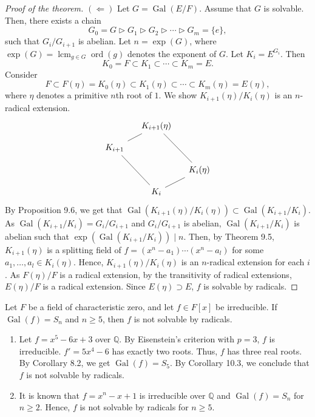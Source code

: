 \documentclass[twoside]{article}
\DeclareMathOperator\Gal{Gal}
\DeclareMathOperator*\lcm{lcm}
\DeclareMathOperator\ord{ord}
\newcommand\Q{\mathbb Q}
\theoremstyle{remark}
\newcounter{theorem}
\begin{document}
\begin{proof}[Proof of the theorem]
  \((\Leftarrow)\) Let \(G = \Gal(E/F)\). Assume that \(G\) is solvable. Then, there exists a chain
  \[ G_0 = G \vartriangleright G_1 \vartriangleright G_2 \vartriangleright \cdots \vartriangleright G_m = \{e\}, \]
  such that \(G_i/G_{i+1}\) is abelian. Let \(n = \exp(G)\), where \(\exp(G) = \lcm_{g \in G} \ord(g)\) denotes the exponent of \(G\). Let \(K_i = E^{G_i}\). Then
  \[ K_0 = F \subset K_1 \subset \cdots \subset K_m = E. \]
  Consider
  \[ F \subset F(\eta) = K_0(\eta) \subset K_1(\eta) \subset \cdots \subset K_m(\eta) = E(\eta), \]
  where \(\eta\) denotes a primitive \(n\)th root of \(1\). We show \(K_{i+1}(\eta)/K_i(\eta)\) is an \(n\)-radical extension.
  \begin{displaymath}
    \begin{tikzcd}[sep=small]
      & K_{i+1}(\eta)\dlar[dash]\ar[ddr,dash] \\
      K_{i+1}\ar[ddr,dash] \\
      && K_i(\eta)\dlar[dash] \\
      & K_i
    \end{tikzcd}
  \end{displaymath}
  By Proposition 9.6, we get that \(\Gal(K_{i+1}(\eta)/K_i(\eta)) \subset \Gal(K_{i+1}/K_i)\). As \(\Gal(K_{i+1}/K_i) = G_i/G_{i+1}\) and \(G_i/G_{i+1}\) is abelian, \(\Gal(K_{i+1}/K_i)\) is abelian such that \(\exp(\Gal(K_{i+1}/K_i)) \mid n\). Then, by Theorem 9.5, \(K_{i+1}(\eta)\) is a splitting field of \(f = (x^n-a_1) \cdots (x^n-a_l)\) for some \(a_1, \dots, a_l \in K_i(\eta)\). Hence, \(K_{i+1}(\eta)/K_i(\eta)\) is an \(n\)-radical extension for each \(i\). As \(F(\eta)/F\) is a radical extension, by the transitivity of radical extensions, \(E(\eta)/F\) is  a radical extension. Since \(E(\eta) \supset E\), \(f\) is solvable by radicals.
\end{proof}

\begin{corollary}
  Let \(F\) be a field of characteristic zero, and let \(f \in F[x]\) be irreducible. If \(\Gal(f) = S_n\) and \(n \geq 5\), then \(f\) is not solvable by radicals.
\end{corollary}

\begin{examples}
  \begin{enumerate}[label=\arabic*.]
    \item Let \(f = x^5 - 6x + 3\) over \(\Q\). By Eisenstein's criterion with \(p=3\), \(f\) is irreducible. \(f' = 5x^4-6\) has exactly two roots. Thus, \(f\) has three real roots. By Corollary 8.2, we get \(\Gal(f) = S_5\). By Corollary 10.3, we conclude that \(f\) is not solvable by radicals.
    \item It is known that \(f = x^n - x + 1\) is irreducible over \(\Q\) and \(\Gal(f) = S_n\) for \(n \geq 2\). Hence, \(f\) is not solvable by radicals for \(n \geq 5\).
  \end{enumerate}
\end{examples}
\end{document}
